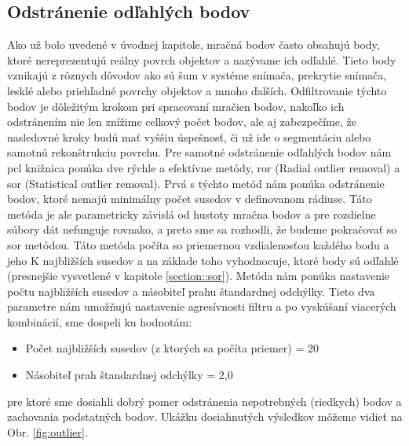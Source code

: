 \subsection{Odstránenie odľahlých bodov}
\noindent Ako už bolo uvedené v úvodnej kapitole, mračná bodov často obsahujú body, ktoré nereprezentujú reálny povrch objektov a nazývame ich odľahlé. Tieto body vznikajú z rôznych dôvodov ako sú šum v systéme snímača, prekrytie snímača, lesklé alebo priehľadné povrchy objektov a mnoho ďalších. Odfiltrovanie týchto bodov je dôležitým krokom pri spracovaní mračien bodov, nakoľko ich odstránením nie len znížime celkový počet bodov, ale aj zabezpečíme, že nasledovné kroky budú mať vyššiu úspešnosť, či už ide o segmentáciu alebo samotnú rekonštrukciu povrchu. 
\newline\indent Pre samotné odstránenie odľahlých bodov nám \acrshort{pcl} knižnica ponúka dve rýchle a efektívne metódy, \acrshort{ror} (Radial outlier removal) a \acrshort{sor} (Statistical outlier removal). Prvá s týchto metód nám ponúka odstránenie bodov, ktoré nemajú minimálny počet susedov v definovanom rádiuse. Táto metóda je ale parametricky závislá od hustoty mračna bodov a pre rozdielne súbory dát nefunguje rovnako, a preto sme sa rozhodli, že budeme pokračovať so \acrshort{sor} metódou. Táto metóda počíta so priemernou vzdialenosťou každého bodu a jeho K najbližších susedov a na základe toho vyhodnocuje, ktoré body sú odľahlé (presnejšie vysvetlené v kapitole \ref{section::sor}). 
\newline\indent Metóda nám ponúka nastavenie počtu najbližších susedov a násobiteľ prahu štandardnej odchýlky. Tieto dva parametre nám umožňujú nastavenie agresívnosti filtru a po vyskúšaní viacerých kombinácií, sme dospeli ku hodnotám:
\begin{itemize}
    \setlength\itemsep{0.2em}
    \item Počet najbližších susedov (z ktorých sa počíta priemer) = 20
    \item Násobiteľ prah štandardnej odchýlky = 2,0
\end{itemize}
pre ktoré sme dosiahli dobrý pomer odstránenia nepotrebných (riedkych) bodov a zachovania podstatných bodov. Ukážku dosiahnutých výsledkov môžeme vidieť na Obr. \ref{fig:outlier}.

